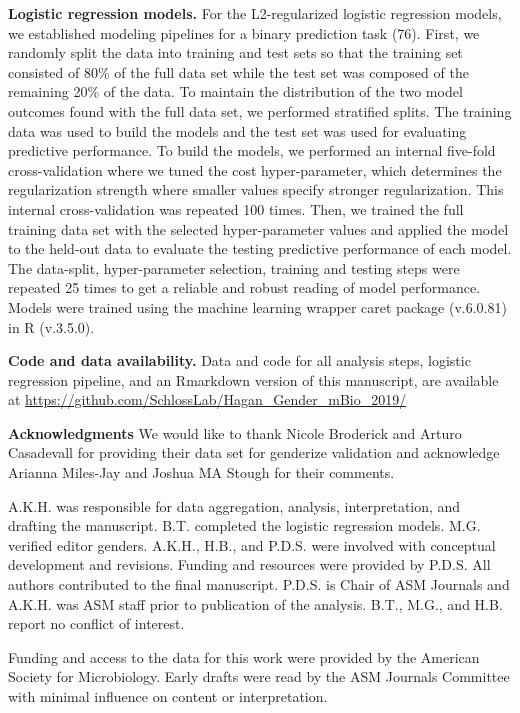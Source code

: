 \documentclass[11pt,]{article}
\begin{document}
\textbf{Logistic regression models.} For the L2-regularized logistic
regression models, we established modeling pipelines for a binary
prediction task (76). First, we randomly split the data into training
and test sets so that the training set consisted of 80\% of the full
data set while the test set was composed of the remaining 20\% of the
data. To maintain the distribution of the two model outcomes found with
the full data set, we performed stratified splits. The training data was
used to build the models and the test set was used for evaluating
predictive performance. To build the models, we performed an internal
five-fold cross-validation where we tuned the cost hyper-parameter,
which determines the regularization strength where smaller values
specify stronger regularization. This internal cross-validation was
repeated 100 times. Then, we trained the full training data set with the
selected hyper-parameter values and applied the model to the held-out
data to evaluate the testing predictive performance of each model. The
data-split, hyper-parameter selection, training and testing steps were
repeated 25 times to get a reliable and robust reading of model
performance. Models were trained using the machine learning wrapper
caret package (v.6.0.81) in R (v.3.5.0).

\textbf{Code and data availability.} Data and code for all analysis
steps, logistic regression pipeline, and an Rmarkdown version of this
manuscript, are available at
\url{https://github.com/SchlossLab/Hagan_Gender_mBio_2019/}

\textbf{Acknowledgments} We would like to thank Nicole Broderick and
Arturo Casadevall for providing their data set for genderize validation
and acknowledge Arianna Miles-Jay and Joshua MA Stough for their
comments.

A.K.H. was responsible for data aggregation, analysis, interpretation,
and drafting the manuscript. B.T. completed the logistic regression
models. M.G. verified editor genders. A.K.H., H.B., and P.D.S. were
involved with conceptual development and revisions. Funding and
resources were provided by P.D.S. All authors contributed to the final
manuscript. P.D.S. is Chair of ASM Journals and A.K.H. was ASM staff
prior to publication of the analysis. B.T., M.G., and H.B. report no
conflict of interest.

Funding and access to the data for this work were provided by the
American Society for Microbiology. Early drafts were read by the ASM
Journals Committee with minimal influence on content or interpretation.
\end{document}
